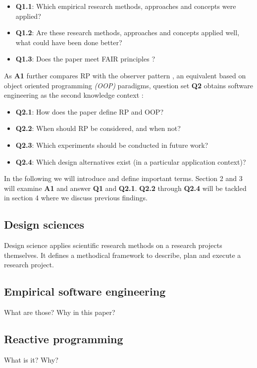 \documentclass[11pt,a4paper,twocolumn]{article}
\begin{document}
	\begin{itemize}
		\item \textbf{Q1.1}: Which empirical research methods, approaches and concepts were applied?
		\item \textbf{Q1.2}: Are these research methods, approaches and concepts applied well, what could have been done better?
		\item \textbf{Q1.3}: Does the paper meet FAIR principles \cite{2019arXiv190805986H} \cite{wilkinson:2016}?
	\end{itemize}

	As \textbf{A1} further compares RP with the observer pattern \cite{gamma1995design}, an equivalent based on object oriented programming \emph{(OOP)} paradigms, question set \textbf{Q2} obtains software engineering as the second knowledge context \cite{balestra:2019:designscience:articactandcontext}:

	\begin{itemize}
		\item \textbf{Q2.1}: How does the paper define RP and OOP?
		\item \textbf{Q2.2}: When should RP be considered, and when not?
		\item \textbf{Q2.3}: Which experiments should be conducted in future work?
		\item \textbf{Q2.4}: Which design alternatives exist (in a particular application context)?
	\end{itemize}

	In the following we will introduce and define important terms. Section 2 and 3 will examine \textbf{A1} and answer \textbf{Q1} and \textbf{Q2.1}. \textbf{Q2.2} through \textbf{Q2.4} will be tackled in section 4 where we discuss previous findings.

	\subsection{Design sciences}
	Design science applies scientific research methods on a research projects themselves. It defines a methodical framework \cite{balestra:2019:designscience:articactandcontext} to describe, plan and execute a research project.

	\subsection{Empirical software engineering}
	What are those? Why in this paper?

	\subsection{Reactive programming}
	What is it? Why?
\end{document}
